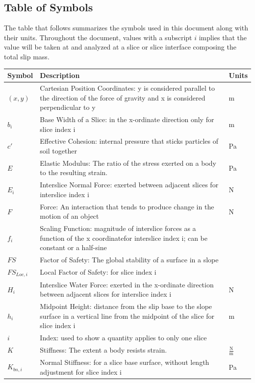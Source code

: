 \documentclass[12pt]{article}
\begin{document}
\subsection{Table of Symbols}
\label{Sec:TablofSymb}
The table that follows summarizes the symbols used in this document along with their units. Throughout the document, values with a subscript $i$ implies that the value will be taken at and analyzed at a slice or slice interface composing the total slip mass.
\begin{longtable*}{l l l}
\toprule
Symbol & Description & Units
\\
\midrule
$(x,y)$ & Cartesian Position Coordinates: y is considered parallel to the direction of the force of gravity and x is considered perpendicular to y & m
\\
$b_{i}$ & Base Width of a Slice: in the x-ordinate direction only for slice index i & m
\\
$c'$ & Effective Cohesion: internal pressure that sticks particles of soil together & Pa
\\
$E$ & Elastic Modulus: The ratio of the stress exerted on a body to the resulting strain. & Pa
\\
$E_{i}$ & Interslice Normal Force: exerted between adjacent slices for interslice index i & N
\\
$F$ & Force: An interaction that tends to produce change in the motion of an object & N
\\
$f_{i}$ & Scaling Function: magnitude of interslice forces as a function of the x coordinatefor interslice index i; can be constant or a half-sine & 
\\
$FS$ & Factor of Safety: The global stability of a surface in a slope & 
\\
$FS_{Loc,i}$ & Local Factor of Safety: for slice index i & 
\\
$H_{i}$ & Interslice Water Force: exerted in the x-ordinate direction between adjacent slices for interslice index i & N
\\
$h_{i}$ & Midpoint Height: distance from the slip base to the slope surface in a vertical line from the midpoint of the slice for slice index i & m
\\
$i$ & Index: used to show a quantity applies to only one slice & 
\\
$K$ & Stiffness: The extent a body resists strain. & $\frac{\text{N}}{\text{m}}$
\\
$K_{bn,i}$ & Normal Stiffness: for a slice base surface, without length adjustment for slice index i & Pa
\\

\end{longtable*}
\end{document}
